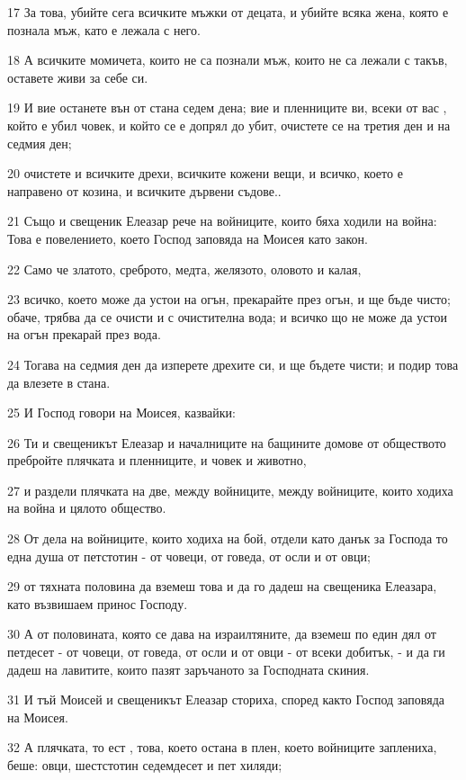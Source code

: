 \par 17 За това, убийте сега всичките мъжки от децата, и убийте всяка жена, която е познала мъж, като е лежала с него.
\par 18 А всичките момичета, които не са познали мъж, които не са лежали с такъв, оставете живи за себе си.
\par 19 И вие останете вън от стана седем дена; вие и пленниците ви, всеки от вас , който е убил човек, и който се е допрял до убит, очистете се на третия ден и на седмия ден;
\par 20 очистете и всичките дрехи, всичките кожени вещи, и всичко, което е направено от козина, и всичките дървени съдове..
\par 21 Също и свещеник Елеазар рече на войниците, които бяха ходили на война: Това е повелението, което Господ заповяда на Моисея като закон.
\par 22 Само че златото, среброто, медта, желязото, оловото и калая,
\par 23 всичко, което може да устои на огън, прекарайте през огън, и ще бъде чисто; обаче, трябва да се очисти и с очистителна вода; и всичко що не може да устои на огън прекарай през вода.
\par 24 Тогава на седмия ден да изперете дрехите си, и ще бъдете чисти; и подир това да влезете в стана.
\par 25 И Господ говори на Моисея, казвайки:
\par 26 Ти и свещеникът Елеазар и началниците на бащините домове от обществото пребройте плячката и пленниците, и човек и животно,
\par 27 и раздели плячката на две, между войниците, между войниците, които ходиха на война и цялото общество.
\par 28 От дела на войниците, които ходиха на бой, отдели като данък за Господа то една душа от петстотин - от човеци, от говеда, от осли и от овци;
\par 29 от тяхната половина да вземеш това и да го дадеш на свещеника Елеазара, като възвишаем принос Господу.
\par 30 А от половината, която се дава на израилтяните, да вземеш по един дял от петдесет - от човеци, от говеда, от осли и от овци - от всеки добитък, - и да ги дадеш на лавитите, които пазят заръчаното за Господната скиния.
\par 31 И тъй Моисей и свещеникът Елеазар сториха, според както Господ заповяда на Моисея.
\par 32 А плячката, то ест , това, което остана в плен, което войниците заплениха, беше: овци, шестстотин седемдесет и пет хиляди;
